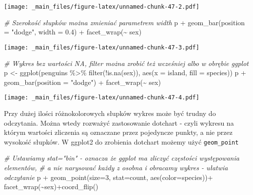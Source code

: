 \documentclass[
]{book}
\newenvironment{Shaded}{\begin{snugshade}}{\end{snugshade}}
\newcommand{\AttributeTok}[1]{\textcolor[rgb]{0.77,0.63,0.00}{#1}}
\newcommand{\CommentTok}[1]{\textcolor[rgb]{0.56,0.35,0.01}{\textit{#1}}}
\newcommand{\DecValTok}[1]{\textcolor[rgb]{0.00,0.00,0.81}{#1}}
\newcommand{\FloatTok}[1]{\textcolor[rgb]{0.00,0.00,0.81}{#1}}
\newcommand{\FunctionTok}[1]{\textcolor[rgb]{0.00,0.00,0.00}{#1}}
\newcommand{\NormalTok}[1]{#1}
\newcommand{\OtherTok}[1]{\textcolor[rgb]{0.56,0.35,0.01}{#1}}
\newcommand{\SpecialCharTok}[1]{\textcolor[rgb]{0.00,0.00,0.00}{#1}}
\newcommand{\StringTok}[1]{\textcolor[rgb]{0.31,0.60,0.02}{#1}}
\begin{document}
\texttt{[image: \_main\_files/figure-latex/unnamed-chunk-47-2.pdf]}

\begin{Shaded}
\begin{Highlighting}[]
\CommentTok{\# Szerokość słupków można zmieniać parametrem width}
\NormalTok{p }\SpecialCharTok{+} \FunctionTok{geom\_bar}\NormalTok{(}\AttributeTok{position =} \StringTok{"dodge"}\NormalTok{, }\AttributeTok{width =} \FloatTok{0.4}\NormalTok{) }\SpecialCharTok{+} \FunctionTok{facet\_wrap}\NormalTok{(}\SpecialCharTok{\textasciitilde{}}\NormalTok{ sex)}
\end{Highlighting}
\end{Shaded}

\texttt{[image: \_main\_files/figure-latex/unnamed-chunk-47-3.pdf]}

\begin{Shaded}
\begin{Highlighting}[]
\CommentTok{\# Wykres bez wartości NA, filter można zrobić też wcześniej albo w obrębie ggplot}
\NormalTok{p }\OtherTok{\textless{}{-}} \FunctionTok{ggplot}\NormalTok{(penguins }\SpecialCharTok{\%\textgreater{}\%} \FunctionTok{filter}\NormalTok{(}\SpecialCharTok{!}\FunctionTok{is.na}\NormalTok{(sex)), }\FunctionTok{aes}\NormalTok{(}\AttributeTok{x =}\NormalTok{ island, }\AttributeTok{fill =}\NormalTok{ species))}
\NormalTok{p }\SpecialCharTok{+} \FunctionTok{geom\_bar}\NormalTok{(}\AttributeTok{position =} \StringTok{"dodge"}\NormalTok{) }\SpecialCharTok{+} \FunctionTok{facet\_wrap}\NormalTok{(}\SpecialCharTok{\textasciitilde{}}\NormalTok{ sex)}
\end{Highlighting}
\end{Shaded}

\texttt{[image: \_main\_files/figure-latex/unnamed-chunk-47-4.pdf]}

Przy dużej ilości różnokolorowych słupków wykres może być trudny do odczytania. Można wtedy rozważyć zastosowanie dotchart - czyli wykresu na którym wartości zliczenia są oznaczane przez pojedyncze punkty, a nie przez wysokość słupków. W ggplot2 do zrobienia dotchart możemy użyć \texttt{geom\_point}

\begin{Shaded}
\begin{Highlighting}[]
\CommentTok{\# Ustawiamy stat="bin" {-} oznacza że ggplot ma zliczyć częstości występowania elementów,}
\CommentTok{\# a nie narysować każdy z osobna i obracamy wykres {-} ułatwia odczytanie}
\NormalTok{p }\SpecialCharTok{+} \FunctionTok{geom\_point}\NormalTok{(}\AttributeTok{size=}\DecValTok{3}\NormalTok{, }\AttributeTok{stat=}\StringTok{\textquotesingle{}count\textquotesingle{}}\NormalTok{, }\FunctionTok{aes}\NormalTok{(}\AttributeTok{color=}\NormalTok{species))}\SpecialCharTok{+}
  \FunctionTok{facet\_wrap}\NormalTok{(}\SpecialCharTok{\textasciitilde{}}\NormalTok{sex)}\SpecialCharTok{+}\FunctionTok{coord\_flip}\NormalTok{()}
\end{Highlighting}
\end{Shaded}
\end{document}
